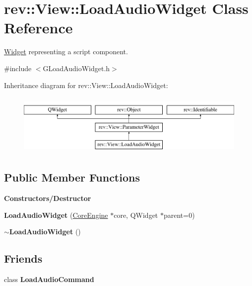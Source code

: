 \hypertarget{classrev_1_1_view_1_1_load_audio_widget}{}\section{rev\+::View\+::Load\+Audio\+Widget Class Reference}
\label{classrev_1_1_view_1_1_load_audio_widget}


\mbox{\hyperlink{class_widget}{Widget}} representing a script component.  




{\ttfamily \#include $<$G\+Load\+Audio\+Widget.\+h$>$}

Inheritance diagram for rev\+::View\+::Load\+Audio\+Widget\+:\begin{figure}[H]
\begin{center}
\leavevmode
\includegraphics[height=3.000000cm]{classrev_1_1_view_1_1_load_audio_widget}
\end{center}
\end{figure}
\subsection*{Public Member Functions}
\begin{Indent}\textbf{ Constructors/\+Destructor}\par
\begin{DoxyCompactItemize}
\item 
\mbox{\label{classrev_1_1_view_1_1_load_audio_widget_a925fee34c0f75013b9cb1b0ca80e297a}} 
{\bfseries Load\+Audio\+Widget} (\mbox{\hyperlink{classrev_1_1_core_engine}{Core\+Engine}} $\ast$core, Q\+Widget $\ast$parent=0)
\item 
\mbox{\label{classrev_1_1_view_1_1_load_audio_widget_a62db3cfee709da9caa229429156f0b2c}} 
{\bfseries $\sim$\+Load\+Audio\+Widget} ()
\end{DoxyCompactItemize}
\end{Indent}
\subsection*{Friends}
\begin{DoxyCompactItemize}
\item 
\mbox{\label{classrev_1_1_view_1_1_load_audio_widget_ad265823c0b19248ce6a86ff869027d8f}} 
class {\bfseries Load\+Audio\+Command}
\end{DoxyCompactItemize}
